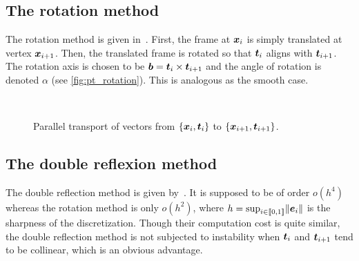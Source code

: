 \subsection{The rotation method}

The rotation method is given in~\cite{Bloomenthal1990}. First, the frame at $\boldsymbol{x}_i$ is simply translated at vertex $\boldsymbol{x}_{i+1}$. Then, the translated frame is rotated so that $\boldsymbol{t}_i$ aligns with $\boldsymbol{t}_{i+1}$. The rotation axis is chosen to be $\boldsymbol{b} = \boldsymbol{t}_i \times \boldsymbol{t}_{i+1}$ and the angle of rotation is denoted $\alpha$ (see \cref{fig:pt_rotation}). This is analogous as the smooth case.

\begin{figure}[!p]
	\captionsetup[subfloat]{captionskip=10pt}
	\centering
	\\
	\vspace{10pt}
	\caption{Parallel transport of vectors from $\{\boldsymbol{x}_i,\boldsymbol{t}_i\}$ to $\{\boldsymbol{x}_{i+1},\boldsymbol{t}_{i+1}\}$.}
	\label{fig:pt}
\end{figure}

%	

\subsection{The double reflexion method}

The double reflection method is given by~\cite{Wang2008}. It is supposed to be of order $o(h^4)$ whereas the rotation method is only $o(h^2)$, where $h = \sup_{i\in \llbracket 0,1 \rrbracket} \lVert\boldsymbol{e}_i\rVert$ is the sharpness of the discretization. Though their computation cost is quite similar, the double reflection method is not subjected to instability when $\boldsymbol{t}_i$ and $\boldsymbol{t}_{i+1}$ tend to be collinear, which is an obvious advantage.

